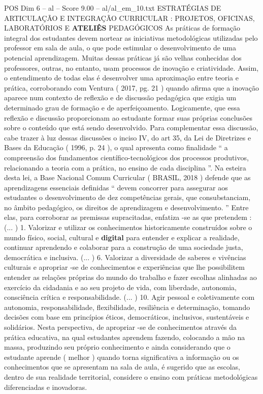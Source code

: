 \begin{textsample}{POS Dim 6 – al – Score 9.00 – al/al\_em\_10.txt}  \label{ex:f6_pos_223}
ESTRATÉGIAS DE ARTICULAÇÃO E INTEGRAÇÃO CURRICULAR : PROJETOS, OFICINAS, LABORATÓRIOS E \textbf{ATELIÊS} PEDAGÓGICOS As práticas de formação integral dos estudantes devem nortear as iniciativas metodológicas utilizadas pelo professor em sala de aula, o que pode estimular o desenvolvimento de uma potencial aprendizagem.
Muitas dessas práticas já são velhas conhecidas dos professores, outras, no entanto, usam processos de inovação e criatividade.
Assim, o entendimento de todas elas é desenvolver uma aproximação entre teoria e prática, corroborando com Ventura ( 2017, pg. 21 ) quando afirma que a inovação aparece num contexto de reflexão e de discussão pedagógica que exigia um determinado grau de formação e de aperfeiçoamento.
Logicamente, que essa reflexão e discussão proporcionam ao estudante formar suas próprias conclusões sobre o conteúdo que está sendo desenvolvido.
Para complementar essa discussão, cabe trazer à luz dessas discussões o inciso IV, do art 35, da Lei de Diretrizes e Bases da Educação ( 1996, p. 24 ), o qual apresenta como finalidade “ a compreensão dos fundamentos científico-tecnológicos dos processos produtivos, relacionando a teoria com a prática, no ensino de cada disciplina ”.
Na esteira desta lei, a Base Nacional Comum Curricular ( BRASIL, 2018 ) defende que as aprendizagens essenciais definidas “ devem concorrer para assegurar aos estudantes o desenvolvimento de dez competências gerais, que consubstanciam, no âmbito pedagógico, os direitos de aprendizagem e desenvolvimento. ” Entre elas, para corroborar as premissas supracitadas, enfatiza -se as que pretendem : (... ) 1.
Valorizar e utilizar os conhecimentos historicamente construídos sobre o mundo físico, social, cultural e \textbf{digital} para entender e explicar a realidade, continuar aprendendo e colaborar para a construção de uma sociedade justa, democrática e inclusiva. (... ) 6.
Valorizar a diversidade de saberes e vivências culturais e apropriar -se de conhecimentos e experiências que lhe possibilitem entender as relações próprias do mundo do trabalho e fazer escolhas alinhadas ao exercício da cidadania e ao seu projeto de vida, com liberdade, autonomia, consciência crítica e responsabilidade. (... ) 10.
Agir pessoal e coletivamente com autonomia, responsabilidade, flexibilidade, resiliência e determinação, tomando decisões com base em princípios éticos, democráticos, inclusivos, sustentáveis e solidários.
Nesta perspectiva, de apropriar -se de conhecimentos através da prática educativa, na qual estudantes aprendem fazendo, colocando a mão na massa, produzindo seu próprio conhecimento e ainda considerando que o estudante aprende ( melhor ) quando torna significativa a informação ou os conhecimentos que se apresentam na sala de aula, é sugerido que as escolas, dentro de sua realidade territorial, considere o ensino com práticas metodológicas diferenciadas e inovadoras.

\end{textsample}
